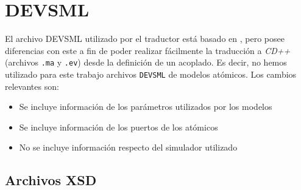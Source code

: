 \section{DEVSML}
El archivo DEVSML utilizado por el traductor está basado en \cite{devsml}, pero posee diferencias con este a fin de poder realizar fácilmente la traducción a \textit{CD++} (archivos \texttt{.ma} y \texttt{.ev}) desde la definición de un acoplado. Es decir, no hemos utilizado para este trabajo archivos \texttt{DEVSML} de modelos atómicos.
Los cambios relevantes son:

\begin{itemize}
	\item Se incluye información de los parámetros utilizados por los modelos
	\item Se incluye información de los puertos de los atómicos
	\item No se incluye información respecto del simulador utilizado 
\end{itemize}

\subsection{Archivos XSD}



